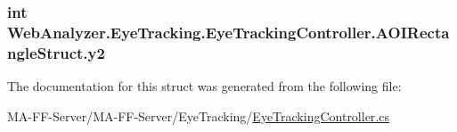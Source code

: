 \subsubsection[{y2}]{\setlength{\rightskip}{0pt plus 5cm}int Web\+Analyzer.\+Eye\+Tracking.\+Eye\+Tracking\+Controller.\+A\+O\+I\+Rectangle\+Struct.\+y2}\label{struct_web_analyzer_1_1_eye_tracking_1_1_eye_tracking_controller_1_1_a_o_i_rectangle_struct_a6a8077e37dbbe0209d058b8d8dde3e46}


The documentation for this struct was generated from the following file\+:\begin{DoxyCompactItemize}
\item 
M\+A-\/\+F\+F-\/\+Server/\+M\+A-\/\+F\+F-\/\+Server/\+Eye\+Tracking/\hyperlink{_eye_tracking_controller_8cs}{Eye\+Tracking\+Controller.\+cs}\end{DoxyCompactItemize}

